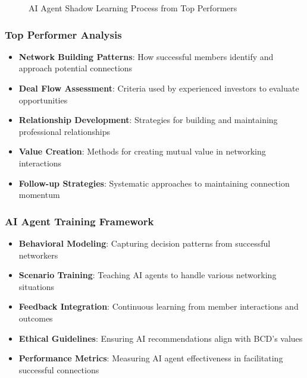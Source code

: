 \begin{figure}[h]
\caption{AI Agent Shadow Learning Process from Top Performers}
\label{fig:shadow-learning-process}
\end{figure}

\subsubsection{Top Performer Analysis}
\begin{itemize}
    \item \textbf{Network Building Patterns}: How successful members identify and approach potential connections
    \item \textbf{Deal Flow Assessment}: Criteria used by experienced investors to evaluate opportunities
    \item \textbf{Relationship Development}: Strategies for building and maintaining professional relationships
    \item \textbf{Value Creation}: Methods for creating mutual value in networking interactions
    \item \textbf{Follow-up Strategies}: Systematic approaches to maintaining connection momentum
\end{itemize}

\subsubsection{AI Agent Training Framework}
\begin{itemize}
    \item \textbf{Behavioral Modeling}: Capturing decision patterns from successful networkers
    \item \textbf{Scenario Training}: Teaching AI agents to handle various networking situations
    \item \textbf{Feedback Integration}: Continuous learning from member interactions and outcomes
    \item \textbf{Ethical Guidelines}: Ensuring AI recommendations align with BCD's values
    \item \textbf{Performance Metrics}: Measuring AI agent effectiveness in facilitating successful connections
\end{itemize}

